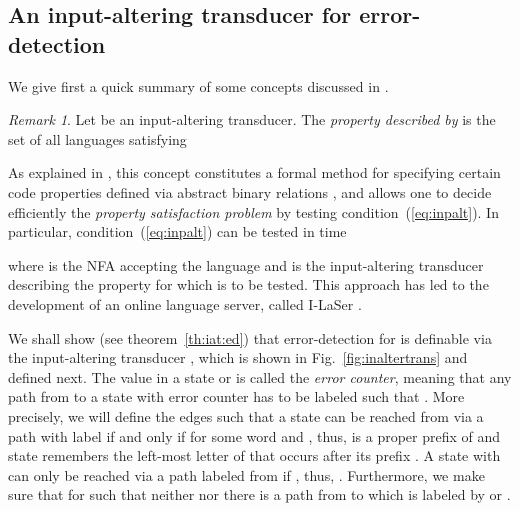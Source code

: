 \documentclass{article}
\theoremstyle{plain}
\theoremstyle{definition}
\theoremstyle{remark}
\newtheorem{remark}[theorem]{Remark}
\begin{document}
\subsection{An input-altering transducer for error-detection}
We give first a quick summary of some concepts discussed
in \cite{DudKon:2012}.

\begin{remark}\label{rem:iat}
Let  be an input-altering transducer. The \emph{property
 described by}  is the set of all languages  satisfying

As explained in \cite{DudKon:2012}, this concept constitutes a formal method for specifying certain code properties defined via abstract
binary relations \cite{Shyr:Thierrin:relations}, and allows one to decide efficiently the
\emph{property satisfaction problem} by testing
condition~(\ref{eq:inpalt}). In particular, condition~(\ref{eq:inpalt}) can be tested
in time

where  is the NFA accepting the language 
and  is the input-altering transducer
describing the property for which  is to be tested.
This approach has led to the development of an
online language  server, called I-LaSer \cite{ilaser}.
\end{remark}

We shall show (see theorem~\ref{th:iat:ed}) that error-detection for  is definable via the input-altering transducer
, which is shown in Fig.~\ref{fig:inaltertrans} and
defined next.
The value  in a state  or  is called the {\em error counter}, meaning that any path from  to a state with error counter  has to be labeled  such that .
More precisely, we will define the edges such that a state  can be reached from  via a path with label   if and only if  for some word  and , thus,  is a proper prefix of  and state  remembers the left-most letter of  that occurs after its prefix .
A state  with  can only be reached via a path labeled  from  if
, thus, .
Furthermore, we make sure that for  such that neither  nor  there is a path from  to  which is labeled by  or .
\end{document}
